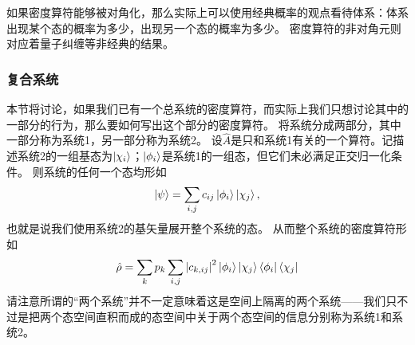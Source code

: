 \documentclass[hyperref, UTF8, a4paper]{ctexart}
\begin{document}
如果密度算符能够被对角化，那么实际上可以使用经典概率的观点看待体系：体系出现某个态的概率为多少，出现另一个态的概率为多少。
密度算符的非对角元则对应着量子纠缠等非经典的结果。

\subsubsection{复合系统}\label{sec:combining-systems}

本节将讨论，如果我们已有一个总系统的密度算符，而实际上我们只想讨论其中的一部分的行为，那么要如何写出这个部分的密度算符。
将系统分成两部分，其中一部分称为系统1，另一部分称为系统2。
设$\hat{A}$是只和系统1有关的一个算符。记描述系统2的一组基态为$\ket{\chi_i}$；$\ket{\phi_i}$是系统1的一组态，但它们未必满足正交归一化条件。
则系统的任何一个态均形如
\[
    \ket{\psi} = \sum_{i, j} c_{ij} \ket{\phi_i} \ket{\chi_j},
\]
也就是说我们使用系统2的基矢量展开整个系统的态。
从而整个系统的密度算符形如
\[
    \hat{\rho} = \sum_k p_k \sum_{i,j} \abs{c_{k,ij}}^2 \ket{\phi_i} \ket{\chi_j} \bra{\phi_i} \bra{\chi_j}
\]
请注意所谓的“两个系统”并不一定意味着这是空间上隔离的两个系统——我们只不过是把两个态空间直积而成的态空间中关于两个态空间的信息分别称为系统1和系统2。
\end{document}
